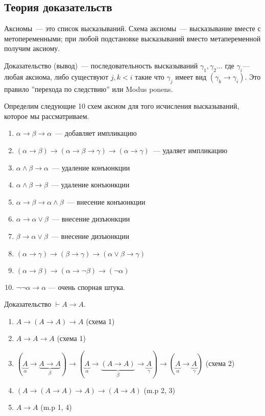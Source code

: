 \subsection{Теория доказательств}
\begin{definition}
    Аксиомы~--- это список высказываний.
    Схема аксиомы~--- высказывание вместе с метопеременными; при любой подстановке высказываний вместо метапеременной получим аксиому. 
\end{definition}

\begin{definition}
    Доказательство (вывод)~--- последовательность высказываний $\gamma_1, \gamma_2\ldots$ где $\gamma_i$--- любая аксиома, 
    либо существуют $j,k < i$ такие что $\gamma_j$ имеет вид $(\gamma_k \to \gamma_i)$.
    Это правило ''перехода по следствию'' или Modus ponens.
\end{definition}

Определим следующие 10 схем аксиом для того исчисления высказываний, которое мы рассматриваем. 
\begin{enumerate}
    \item $\alpha \to \beta \to \alpha$~--- добавляет импликацию
    \item $(\alpha \to \beta) \to (\alpha \to \beta \to \gamma) \to (\alpha \to \gamma)$~--- удаляет импликацию
    \item $\alpha \land \beta \to \alpha$~--- удаление конъюнкции
    \item $\alpha \land \beta \to \beta$~--- удаление конъюнкции
    \item $\alpha \to \beta \to \alpha \land \beta$~--- внесение конъюнкции
    \item $\alpha \to \alpha \lor \beta$~--- внесение дизъюнкции
    \item $\beta \to \alpha \lor \beta$~--- внесение дизъюнкции
    \item $(\alpha \to \gamma) \to (\beta \to \gamma) \to (\alpha \lor \beta \to \gamma)$
    \item $(\alpha \to \beta) \to (\alpha \to \neg \beta) \to (\neg \alpha)$
    \item $\neg \neg \alpha \to \alpha$ --- очень спорная штука.
\end{enumerate}

\begin{example} Доказательство
    $\vdash A \to A $.
    \begin{enumerate}
        \item $A \to (A \to A) \to A$ (схема 1)
        \item $A \to A \to A$  (схема 1)
        \item $(\underbrace{A}_\alpha \to \underbrace{A \to A}_\beta) \to (\underbrace{A}_\alpha \to \underbrace{(A \to A)}_\beta \to \underbrace{A}_\gamma) \to (\underbrace{A}_\alpha \to \underbrace{A}_\gamma)$  (схема 2)
        \item $(A \to (A \to A) \to A) \to (A \to A)$ (m.p 2, 3)
        \item $A \to A$ (m.p 1, 4)
    \end{enumerate}
\end{example}